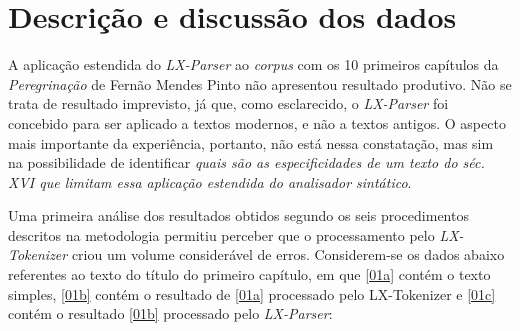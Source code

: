 \documentclass[portuguese]{textolivre}
\begin{document}
\section{Descrição e discussão dos dados}

A aplicação estendida do \textit{LX-Parser} ao \textit{corpus} com os 10 primeiros capítulos da \textit{Peregrinação} de Fernão Mendes Pinto não apresentou resultado produtivo. Não se trata de resultado imprevisto, já que, como esclarecido, o \textit{LX-Parser} foi concebido para ser aplicado a textos modernos, e não a textos antigos. O aspecto mais importante da experiência, portanto, não está nessa constatação, mas sim na possibilidade de identificar \textit{quais são as especificidades de um texto do séc. XVI que limitam essa aplicação estendida do analisador sintático}.

Uma primeira análise dos resultados obtidos segundo os seis procedimentos descritos na metodologia permitiu perceber que o processamento pelo \textit{LX-Tokenizer} criou um volume considerável de erros. Considerem-se os dados abaixo referentes ao texto do título do primeiro capítulo, em que \ref{01a} contém o texto simples, \ref{01b} contém o resultado de \ref{01a} processado pelo LX-Tokenizer e \ref{01c} contém o resultado \ref{01b} processado pelo \textit{LX-Parser}:
\end{document}
